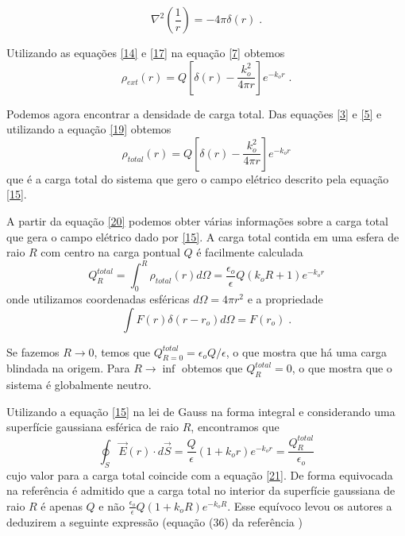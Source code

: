 \documentclass[brazilian,10.7pt,a4paper]{article}
\begin{document}
\begin{multicols}{2}
\begin{equation}\label{18}
\nabla^{2}(\frac{1}{r})=-4\pi\delta(r)\;.
\end{equation}
\par Utilizando as equações \eqref{14} e \eqref{17} na equação \eqref{7} obtemos
\\
\begin{equation}\label{19}
\rho_{ext}(r)=Q[\delta(r)-\frac{k^{2}_{o}}{4\pi r}]e^{-k_{o}r}\;.
\end{equation}
\par Podemos agora encontrar a densidade de carga total. Das equações \eqref{3} e \eqref{5} e utilizando a equação \eqref{19} obtemos
\\
\begin{equation}\label{20}
\rho_{total}(r)=Q[\delta(r)-\frac{k^{2}_{o}}{4\pi r}]e^{-k_{o}r}
\end{equation}
que é a carga total do sistema que gero o campo elétrico descrito pela equação \eqref{15}.
\par A partir da equação \eqref{20} podemos obter várias informações sobre a carga total que gera o campo elétrico dado por \eqref{15}. A carga total contida em uma esfera de raio $R$ com centro na carga pontual $Q$ é facilmente calculada
\\
\begin{equation}\label{21}
Q^{total}_{R}=\int^{R}_{0}\rho_{total}(r)d\Omega=\frac{\epsilon_{o}}{\epsilon}Q(k_{o}R+1)e^{-k_{o}r}
\end{equation}
onde utilizamos coordenadas esféricas $d\Omega=4\pi r^{2}$ e a propriedade
\\
\begin{equation}
\int{F(r)\delta(r-r_{o})d\Omega}=F(r_{o})\;.
\end{equation}
\par Se fazemos $R\rightarrow 0$, temos que $Q^{total}_{R=0} = \epsilon_{o}Q/\epsilon$, o que mostra que há uma carga blindada na origem. Para $R \rightarrow \inf$ obtemos que $Q^{total}_{R}=0$, o que mostra que o sistema é globalmente neutro.
\par Utilizando a equação \eqref{15} na lei de Gauss na forma integral e considerando uma superfície gaussiana esférica de raio $R$, encontramos que
\\
\begin{equation}\label{22}
\oint_{S}{\vec{E}(r)\cdot d\vec{S}}=\frac{Q}{\epsilon}(1+k_{o}r)e^{-k_{o}r}=\frac{Q^{total}_{R}}{\epsilon_{o}}
\end{equation}
cujo valor para a carga total coincide com a equação \eqref{21}. De forma equivocada na referência \cite{ramos} é admitido que a carga total no interior da superfície gaussiana de raio $R$ é apenas $Q$ e não $\frac{\epsilon_{o}}{\epsilon}Q(1+k_{o}R)e^{-k_{o}R}$. Esse equívoco levou os autores a deduzirem a seguinte expressão (equação (36) da referência \cite{ramos})

\end{multicols}
\end{document}
